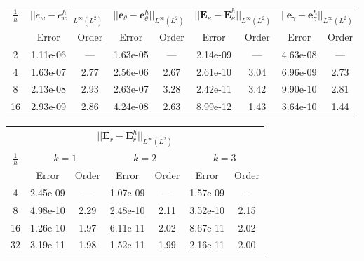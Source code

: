\begin{table}[hp]
	\centering
	\begin{tabular}{ccccccccc}
		\hline 
		\multirow{2}{*}{$\frac{1}{h}$} & \multicolumn{2}{c}{$||e_w - e_w^h||_{L^{\infty}(L^2)}$}    & \multicolumn{2}{c}{$||\bm{e}_\theta - \bm{e}_\theta^h||_{L^{\infty}(L^2)}$} & \multicolumn{2}{c}{$||\bm{E}_\kappa - \bm{E}_\kappa^h||_{L^{\infty}(L^2)}$} & \multicolumn{2}{c}{$||\bm{e}_\gamma - \bm{e}_\gamma^ h||_{L^{\infty}(L^2)}$}   \\ 
		& Error & Order  & Error & Order  & Error & Order  & Error & Order   \\ 
		\hline 
		2  & 1.11e-06 & ---  & 1.63e-05 & ---  & 2.14e-09 & ---  & 4.63e-08 & --- \\ 
		4  & 1.63e-07 & 2.77 & 2.56e-06 & 2.67 & 2.61e-10 & 3.04 & 6.96e-09 & 2.73\\ 
		8  & 2.13e-08 & 2.93 & 2.63e-07 & 3.28 & 2.42e-11 & 3.42 & 9.90e-10 & 2.81\\ 
		16 & 2.93e-09 & 2.86 & 4.24e-08 & 2.63 & 8.99e-12 & 1.43 & 3.64e-10 & 1.44\\ 
		\hline 
	\end{tabular} 
	\captionsetup{width=0.95\linewidth}
	\vspace{1mm}
	\label{tab:resminAFW_k3}
\end{table}

\begin{table}[hp]
	\centering
	\begin{tabular}{ccccccc}
		\hline 
		\multicolumn{7}{c}{$||\bm{E}_r - \bm{E}_r^h||_{L^{\infty}(L^2)}$} \\
		\multirow{2}{*}{$\frac{1}{h}$} & \multicolumn{2}{c}{$k=1$}    & \multicolumn{2}{c}{$k=2$} & \multicolumn{2}{c}{$k=3$}   \\ 
		& Error & Order  & Error & Order  & Error & Order \\ 
		\hline 
		4  & 2.45e-09 & ---  & 1.07e-09 & ---  & 1.57e-09 & ---  \\ 
		8  & 4.98e-10 & 2.29 & 2.48e-10 & 2.11 & 3.52e-10 & 2.15 \\ 
		16 & 1.26e-10 & 1.97 & 6.11e-11 & 2.02 & 8.67e-11 & 2.02 \\ 
		32 & 3.19e-11 & 1.98 & 1.52e-11 & 1.99 & 2.16e-11 & 2.00 \\ 
		\hline 
	\end{tabular} 
	\captionsetup{width=0.95\linewidth}
	\vspace{1mm}
	\label{tab:resminAFW_r}
\end{table}

